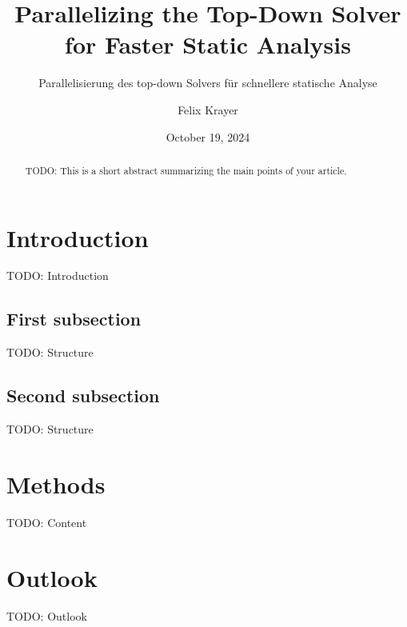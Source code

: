 \documentclass[
  english,        %
  font=times,     %
  twocolumn,      %
]{tumarticle}
\title{Parallelizing the Top-Down Solver for Faster Static Analysis}
\subtitle{Parallelisierung des top-down Solvers für schnellere statische Analyse}
\author[affil=1, email=felix.krayer@tum.de]{Felix Krayer}
\affil[mark=1]{\theUniversityName}
\date{October 19, 2024}
\begin{document}
\maketitle

\begin{abstract}
  TODO: This is a short abstract summarizing the main points of your article.
\end{abstract}

\section{Introduction}
TODO: Introduction
\subsection{First subsection}
TODO: Structure
\subsection{Second subsection}
TODO: Structure


\section{Methods}
TODO: Content

\section{Outlook}
TODO: Outlook
\lipsum
\end{document}
